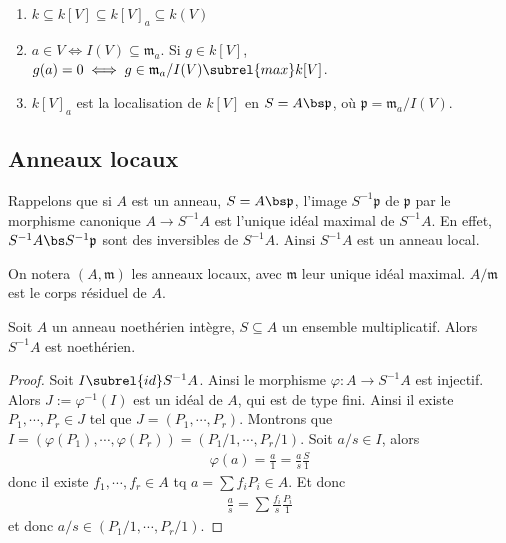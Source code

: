             \begin{remq}
                \begin{enumerate}
                \item $k \subseteq k[V] \subseteq k[V]_a \subseteq k(V)$
                \item $a \in V \iff I(V) \subseteq \mathfrak{m}_a$. Si $g \in k[V]$, $g(a) = 0 \iff g \in \mathfrak{m}_a/I(V) \subrel{max} k[V]$.
                \item $k[V]_a$ est la localisation de $k[V]$ en $S = A \bs \mathfrak{p}$, où $\mathfrak{p} = \mathfrak{m}_a/I(V)$. 
                \end{enumerate}
            \end{remq}

        \subsection{Anneaux locaux}
            Rappelons que si $A$ est un anneau, $S = A \bs \mathfrak{p}$, l'image $S^{-1} \mathfrak{p}$ de $\mathfrak{p}$ par le morphisme canonique $A \to S^{-1}A$ est l'unique idéal maximal de $S^{-1}A$. En effet, $S^{-1} A \bs S^{-1}\mathfrak{p}$ sont des inversibles de $S^{-1}A$. Ainsi $S^{-1}A$ est un anneau local. 
            \begin{nota}
                On notera $(A, \mathfrak{m})$ les anneaux locaux, avec $\mathfrak{m}$ leur unique idéal maximal. $A/\mathfrak{m}$ est le corps résiduel de $A$.
            \end{nota}
            \begin{prop}
                Soit $A$ un anneau noethérien intègre, $S \subseteq A$ un ensemble multiplicatif. Alors $S^{-1}A$ est noethérien.
            \end{prop}
            \begin{proof}
                Soit $I \subrel{id} S^{-1}A$. Ainsi le morphisme $\varphi : A \to S^{-1}A$ est injectif. Alors $J := \varphi^{-1}(I)$ est un idéal de $A$, qui est de type fini. Ainsi il existe $P_1, \cdots, P_r \in J$ tel que $J = (P_1, \cdots, P_r)$. Montrons que $I = (\varphi(P_1), \cdots, \varphi(P_r)) = (P_1/1, \cdots, P_r/1)$. Soit $a/s \in I$, alors 
                \begin{align*}
                    \varphi(a) = \frac a1 = \frac as \frac S1
                \end{align*}
                donc il existe $f_1, \cdots, f_r \in A$ tq $a = \sum f_i P_i \in A$. Et donc
                \begin{align*}
                    \frac as = \sum \frac{f_i}s \frac{P_i}1
                \end{align*}
                et donc $a/s \in (P_1/1, \cdots, P_r/1)$.
            \end{proof}
